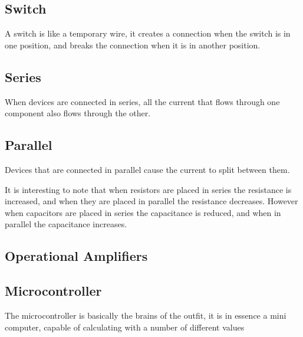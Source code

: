 \subsection{Switch}
A switch is like a temporary wire, it creates a connection when the switch is in one position, and breaks the connection when it is in another position.

\subsection{Series}
When devices are connected in series, all the current that flows through one component also flows through the other.

\subsection{Parallel}
Devices that are connected in parallel cause the current to split between them.

It is interesting to note that when resistors are placed in series the resistance is increased, and when they are placed in parallel the resistance decreases.
However when capacitors are placed in series the capacitance is reduced, and when in parallel the capacitance increases.

\subsection{Operational Amplifiers}


% 

\subsection{Microcontroller}

The microcontroller is basically the brains of the outfit, it is in essence a mini computer, capable of calculating with a number of different values

%
